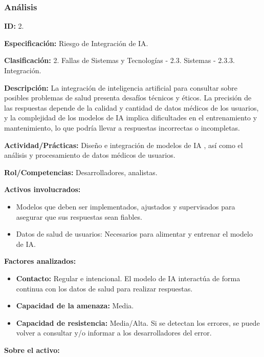 \documentclass[a4paper,12pt]{article}
\begin{document}
    \subsubsection{Análisis}
    \par \textbf{ID:} 2.
    \par \textbf{Especificación:} Riesgo de Integración de IA.
    \par \textbf{Clasificación:} 2. Fallas de Sistemas y Tecnologías - 2.3. Sistemas - 2.3.3. Integración.
    \par \textbf{Descripción:} La integración de inteligencia artificial para consultar sobre posibles problemas de salud presenta desafíos técnicos y éticos. La precisión de las respuestas depende de la calidad y cantidad de datos médicos de los usuarios, y la complejidad de los modelos de IA implica dificultades en el entrenamiento y mantenimiento, lo que podría llevar a respuestas incorrectas o incompletas.
    \par \textbf{Actividad/Prácticas:} Diseño e integración de modelos de IA , así como el análisis y procesamiento de datos médicos de usuarios.
    \par \textbf{Rol/Competencias:} Desarrolladores, analistas.
    \par \textbf{Activos involucrados:}
    \begin{itemize}
        \item Modelos que deben ser implementados, ajustados y supervisados para asegurar que sus respuestas sean fiables.
        \item Datos de salud de usuarios: Necesarios para alimentar y entrenar el modelo de IA.
    \end{itemize}
    \par \textbf{Factores analizados:}
    \begin{itemize}
        \item \textbf{Contacto:} Regular e intencional.  El modelo de IA interactúa de forma continua con los datos de salud para realizar respuestas.
        \item \textbf{Capacidad de la amenaza:} Media.
        \item \textbf{Capacidad de resistencia:} Media/Alta. Si se detectan los errores, se puede volver a consultar y/o informar a los desarrolladores del error.
    \end{itemize}
    \par \textbf{Sobre el activo:}
\end{document}
